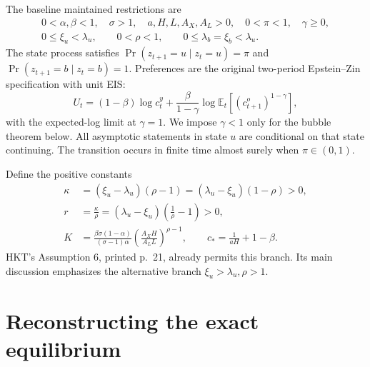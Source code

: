 \documentclass[11pt,a4paper]{article}
\newcommand{\E}{\mathbb E}
\begin{document}
The baseline maintained restrictions are
\begin{gather}
0<\alpha,\beta<1,\quad \sigma>1,\quad a,H,L,A_X,A_L>0,
\quad 0<\pi<1,\quad \gamma\geq0,\label{eq:primitives}\\
0\leq\xi_u<\lambda_u,\qquad 0<\rho<1,\qquad
0\leq\lambda_b=\xi_b<\lambda_u.\label{eq:assumptions}
\end{gather}
The state process satisfies $\Pr(z_{t+1}=u\mid z_t=u)=\pi$ and
$\Pr(z_{t+1}=b\mid z_t=b)=1$. Preferences are the original two-period
Epstein--Zin specification with unit EIS:
\begin{equation}
U_t=(1-\beta)\log c^y_t+
\frac{\beta}{1-\gamma}\log\E_t[(c^o_{t+1})^{1-\gamma}],\label{eq:utility}
\end{equation}
with the expected-log limit at $\gamma=1$. We impose $\gamma<1$ only for the
bubble theorem below. All asymptotic statements in state $u$ are conditional
on that state continuing. The transition occurs in finite time almost surely
when $\pi\in(0,1)$.

Define the positive constants
\begin{align}
\kappa&=(\xi_u-\lambda_u)(\rho-1)
       =(\lambda_u-\xi_u)(1-\rho)>0,\label{eq:kappa}\\
r&=\frac{\kappa}{\rho}
  =(\lambda_u-\xi_u)\left(\frac1\rho-1\right)>0,\label{eq:r}\\
K&=\frac{\beta\sigma(1-\alpha)}{(\sigma-1)\alpha}
       \left(\frac{A_XH}{A_LL}\right)^{\rho-1},\qquad
c_* = \frac1{aH}+1-\beta.\label{eq:constants}
\end{align}
HKT's Assumption 6, printed p.~21, already permits this branch. Its main
discussion emphasizes the alternative branch $\xi_u>\lambda_u,\rho>1$.

\section{Reconstructing the exact equilibrium}
\end{document}
